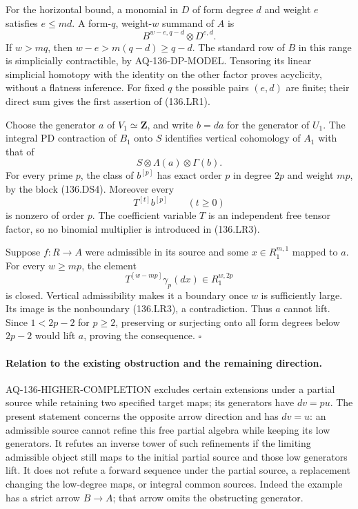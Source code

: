 For the horizontal bound, a monomial in $D$ of form degree $d$
and weight $e$ satisfies $e\leq md$.  A form-$q$, weight-$w$
summand of $A$ is
\[
                  B^{w-e,q-d}\otimes D^{e,d}.
\]
If $w>mq$, then
$w-e>m(q-d)\geq q-d$.  The standard row of $B$ in this range is
simplicially contractible, by AQ-136-DP-MODEL.  Tensoring its linear
simplicial homotopy with the identity on the other factor proves
acyclicity, without a flatness inference.  For fixed $q$ the
possible pairs $(e,d)$ are finite; their direct sum gives the
first assertion of (136.LR1).

Choose the generator $a$ of $V_1\simeq\mathbf Z$, and write
$b=da$ for the generator of $U_1$.  The integral PD contraction
of $B_1$ onto $S$ identifies vertical cohomology of $A_1$ with
that of
\[
                     S\otimes\Lambda(a)\otimes\Gamma(b).
\]
For every prime $p$, the class of $b^{[p]}$ has exact order $p$
in degree $2p$ and weight $mp$, by the block (136.DS4).
Moreover every
\[
                    T^{[t]}b^{[p]}\qquad(t\geq0)           \tag{136.LR3}
\]
is nonzero of order $p$.  The coefficient variable $T$ is an
independent free tensor factor, so no binomial multiplier is
introduced in (136.LR3).

Suppose $f:R\to A$ were admissible in its source and some
$x\in R_1^{m,1}$ mapped to $a$.  For every $w\geq mp$, the element
\[
                 T^{[w-mp]}\gamma_p(dx)\in R_1^{w,2p}
\]
is closed.  Vertical admissibility makes it a boundary once
$w$ is sufficiently large.  Its image is the nonboundary
(136.LR3), a contradiction.  Thus $a$ cannot lift.  Since
$1<2p-2$ for $p\geq2$, preserving or surjecting onto all form
degrees below $2p-2$ would lift $a$, proving the consequence.
\hfill$\square$

\paragraph{Relation to the existing obstruction and the remaining direction.}
AQ-136-HIGHER-COMPLETION excludes certain extensions under a partial
source while retaining two specified target maps; its generators
have $dv=p u$.  The present statement concerns the opposite arrow
direction and has $dv=u$: an admissible source cannot refine this
free partial algebra while keeping its low generators.  It refutes
an inverse tower of such refinements if the limiting admissible
object still maps to the initial partial source and those low
generators lift.  It does not refute a forward sequence under the
partial source, a replacement changing the low-degree maps, or
integral common sources.  Indeed the example has a strict arrow
$B\to A$; that arrow omits the obstructing generator.
